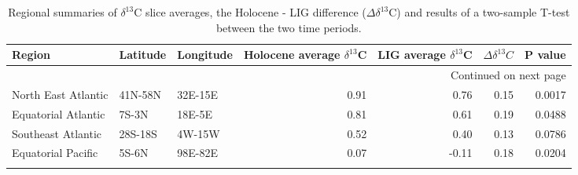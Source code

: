 \begin{longtable}{lllrrrr}

              Region & Latitude & Longitude &  Holocene average $\delta^{13}$C &  LIG average $\delta^{13}$C &  $\Delta\delta^{13}C$ &  P value \\

\endhead

\multicolumn{7}{r}{{Continued on next page}} \\

\endfoot


\endlastfoot
 North East Atlantic &  41N-58N &   32E-15E &                   0.91 &              0.76 &   0.15 &   0.0017 \\
 Equatorial Atlantic &    7S-3N &    18E-5E &                   0.81 &              0.61 &   0.19 &   0.0488 \\
  Southeast Atlantic &  28S-18S &    4W-15W &                   0.52 &              0.40 &   0.13 &   0.0786 \\
  Equatorial Pacific &    5S-6N &   98E-82E &                   0.07 &             -0.11 &   0.18 &   0.0204 \\
\caption{Regional summaries of $\delta^{13}$C slice averages, the Holocene - LIG difference ($\Delta\delta^{13}$C) and results of a two-sample T-test between the two time periods.}\end{longtable}
